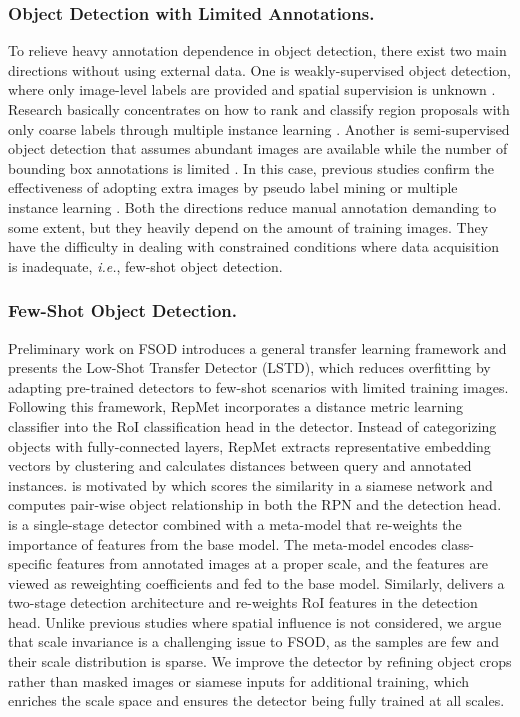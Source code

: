 \documentclass[runningheads]{llncs}
\begin{document}
\subsubsection{Object Detection with Limited Annotations.}
To relieve heavy annotation dependence in object detection, there exist two main directions without using external data. 
One is weakly-supervised object detection, where only image-level labels are provided and spatial supervision is unknown \cite{wsddn}. 
Research basically concentrates on how to rank and classify region proposals with only coarse labels through multiple instance learning \cite{oicr,wsrpn,cmil}. 
Another is semi-supervised object detection that assumes abundant images are available while the number of bounding box annotations is limited \cite{video}. 
In this case, previous studies confirm the effectiveness of adopting extra images by pseudo label mining \cite{fewexample,notercnn} or multiple instance learning \cite{disease}. 
Both the directions reduce manual annotation demanding to some extent, but they heavily depend on the amount of training images. 
They have the difficulty in dealing with constrained conditions where data acquisition is inadequate, \emph{i.e.}, few-shot object detection.


\subsubsection{Few-Shot Object Detection.}
Preliminary work \cite{lstd} on FSOD introduces a general transfer learning framework and presents the Low-Shot Transfer Detector (LSTD), which reduces overfitting by adapting pre-trained detectors to few-shot scenarios with limited training images. 
Following this framework, RepMet \cite{repmet} incorporates a distance metric learning classifier into the RoI classification head in the detector. 
Instead of categorizing objects with fully-connected layers, RepMet extracts representative embedding vectors by clustering and calculates distances between query and annotated instances. 
\cite{matchdet} is motivated by \cite{siamese} which scores the similarity in a siamese network and computes pair-wise object relationship in both the RPN and the detection head. 
\cite{yolore} is a single-stage detector combined with a meta-model that re-weights the importance of features from the base model. 
The meta-model encodes class-specific features from annotated images at a proper scale, and the features are viewed as reweighting coefficients and fed to the base model. 
Similarly, \cite{metarcnn} delivers a two-stage detection architecture and re-weights RoI features in the detection head. 
Unlike previous studies where spatial influence is not considered, we argue that scale invariance is a challenging issue to FSOD, as the samples are few and their scale distribution is sparse.
We improve the detector by refining object crops rather than masked images \cite{yolore,metarcnn} or siamese inputs \cite{matchdet} for additional training, which enriches the scale space and ensures the detector being fully trained at all scales.
\end{document}
